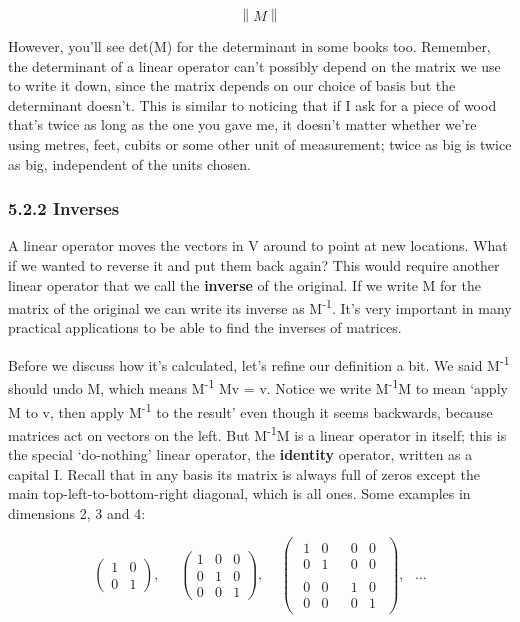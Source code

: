 \documentclass[oneside,english]{amsbook}
\numberwithin{section}{chapter}
\theoremstyle{plain}
\theoremstyle{definition}
\begin{document}
\[\left\| M \right\|\]

However, you'll see det(M) for the determinant in some books too.
Remember, the determinant of a linear operator can't possibly depend on
the matrix we use to write it down, since the matrix depends on our
choice of basis but the determinant doesn't. This is similar to noticing
that if I ask for a piece of wood that's twice as long as the one you
gave me, it doesn't matter whether we're using metres, feet, cubits or
some other unit of measurement; twice as big is twice as big,
independent of the units chosen.

\subsubsection{5.2.2 Inverses}\label{inverses}

A linear operator moves the vectors in V around to point at new
locations. What if we wanted to reverse it and put them back again? This
would require another linear operator that we call the \textbf{inverse}
of the original. If we write M for the matrix of the original we can
write its inverse as M\textsuperscript{-1}. It's very important in many
practical applications to be able to find the inverses of matrices.

Before we discuss how it's calculated, let's refine our definition a
bit. We said M\textsuperscript{-1} should undo M, which means
M\textsuperscript{-1} Mv = v. Notice we write M\textsuperscript{-1}M to
mean `apply M to v, then apply M\textsuperscript{-1} to the result'
even though it seems backwards, because matrices act on vectors on the
left. But M\textsuperscript{-1}M is a linear operator in itself; this is
the special `do-nothing' linear operator, the \textbf{identity}
operator, written as a capital I. Recall that in any basis its matrix is
always full of zeros except the main top-left-to-bottom-right diagonal,
which is all ones. Some examples in dimensions 2, 3 and 4:

\[\begin{pmatrix}
	1 & 0 \\
	0 & 1
\end{pmatrix},\ \ \ \ \ \ \begin{pmatrix}
	1 & 0 & 0 \\
	0 & 1 & 0 \\
	0 & 0 & 1
\end{pmatrix},\ \ \ \ \ \begin{pmatrix}
	\begin{matrix}
		1 & 0 \\
		0 & 1
	\end{matrix} & \begin{matrix}
		0 & 0 \\
		0 & 0
	\end{matrix} \\
	\begin{matrix}
		0 & 0 \\
		0 & 0
	\end{matrix} & \begin{matrix}
		1 & 0 \\
		0 & 1
	\end{matrix}
\end{pmatrix},\ \ \ \ldots\]
\end{document}
